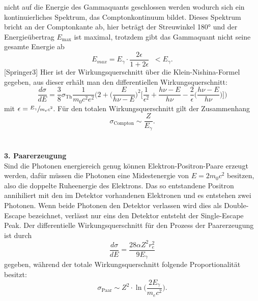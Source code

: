nicht auf die Energie des Gammaquants geschlossen werden wodurch sich ein kontinuierliches
Spektrum, das Comptonkontinuum bildet. Dieses Spektrum bricht an der Comptonkante ab, hier
beträgt der Streuwinkel 180° und der Energieübertrag $E_{\text{max}}$ ist maximal, trotzdem gibt das
Gammaquant nicht seine gesamte Energie ab
\begin{equation}
  E_{max}=E_{\gamma}\cdot\frac{2\epsilon}{1+2\epsilon}\;\;<E_{\gamma}.
  \label{eqn:kante}
\end{equation}
[Springer3]
Hier ist der Wirkungsquerschnitt über die Klein-Nishina-Formel gegeben, aus dieser erhält man
den differentiellen Wirkungsquerschnitt:
\begin{equation}
  \frac{d\sigma}{dE}=\frac{3}{8}\sigma_{\text{Th}}\frac{1}{m_0 c^2 e^2}\bigg(2+\bigg(\frac{E}{h\nu-E} \bigg)^2 \bigg[\frac{1}{\epsilon^2}+
  \frac{h\nu-E}{h\nu}-\frac{2}{\epsilon}\bigg(\frac{h\nu-E}{h\nu}\bigg) \bigg]\bigg)
  \label{eqn:diffCompton}
\end{equation}
mit $\epsilon=\sfrac{E_{\gamma}}{m_e c^2}$.
Für den totalen Wirkungsquerschnitt gilt der Zusammenhang
\begin{equation}
  \sigma_{\text{Compton}}\sim \frac{Z}{E_{\gamma}}.
  \label{eqn:WPCompton}
\end{equation}
\\
\\
\textbf{3. Paarerzeugung}\\
Sind die Photonen energiereich genug können Elektron-Positron-Paare erzeugt werden, dafür müssen
die Photonen eine Midestenergie von $E=2 m_0 c^2$ besitzen, also die doppelte
Ruheenergie des Elektrons.
Das so entstandene Positron annihiliert mit den im Detektor vorhandenen Elektronen und es
entstehen zwei Photonen. Wenn beide Photonen den Detektor verlassen wird dies als Double-Escape
bezeichnet, verlässt nur eins den Detektor entsteht der Single-Escape Peak.
Der differentielle Wirkungsquerschnitt für den Prozess der Paarerzeugung ist durch
\begin{equation}
  \frac{d\sigma}{dE}= \frac{28\alpha Z^2 r_{e}^2}{9E_{\gamma}}
  \label{eqn:diffPaar}
\end{equation}
gegeben, während der totale Wirkungsquerschnitt folgende Proportionalität besitzt:
\begin{equation}
  \sigma_{\text{Paar}}\sim Z^2\cdot\ln\Bigg(\frac{2E_{\gamma}}{m_e c^2}\Bigg).
  \label{eqn:WQPaar}
\end{equation}
\\

